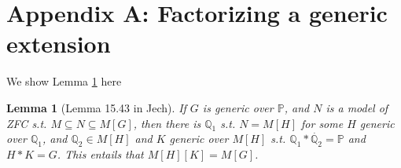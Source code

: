 \documentclass{article}
\newtheorem{lemma}{Lemma}
\newtheorem{theorem}{Theorem}
\newcommand{\bbP}{\mathbb{P}}
\newcommand{\bbQ}{\mathbb{Q}}
\begin{document}





\section{Appendix A: Factorizing a generic extension}\label{App:factorize}

We show Lemma \ref{lem:general-factorize} here 

\begin{lemma}[Lemma 15.43 in Jech]\label{lem:general-factorize}
    If $G$ is generic over $\bbP$, and $N$ is a model of ZFC s.t. $M\subseteq N\subseteq M[G]$, then there is $\bbQ_1$ s.t. $N = M[H]$ for some $H$ generic over $\bbQ_1$, and $\bbQ_2\in M[H]$ and $K$ generic over $M[H]$ s.t. $\bbQ_1 *\dot{\bbQ_2} = \bbP$ and $H*K = G$. This entails that $M[H][K] = M[G]$.
\end{lemma}
\end{document}
